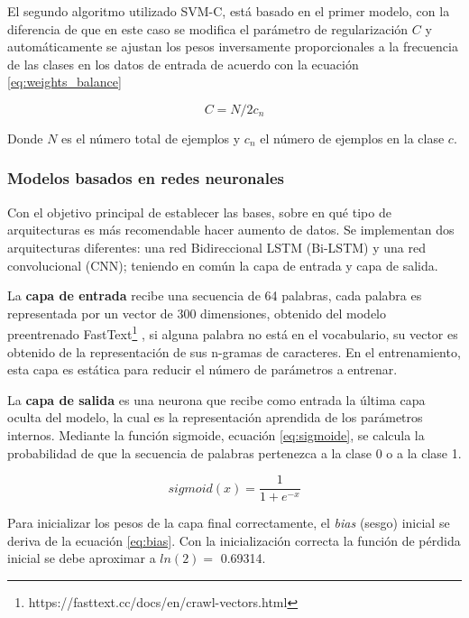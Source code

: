  El segundo algoritmo utilizado SVM-C, está basado en el primer modelo, con la diferencia de que en este caso se modifica el parámetro de regularización $C$ y automáticamente se ajustan los pesos inversamente proporcionales a la frecuencia de las clases en los datos de entrada de acuerdo con la ecuación \ref{eq:weights_balance}
 
 \begin{equation}
 \label{eq:weights_balance}
     C = N/2c_n
 \end{equation}
 
 Donde $N$ es el número total de ejemplos y $c_n$ el número de ejemplos en la clase $c$.  

\subsubsection{Modelos basados en redes neuronales}

Con el objetivo principal de establecer las bases, sobre en qué tipo de arquitecturas es más recomendable hacer aumento de datos. Se implementan dos arquitecturas diferentes: una red Bidireccional LSTM (Bi-LSTM) y una red convolucional (CNN); teniendo en común la capa de entrada y capa de salida.

La \textbf{capa de entrada} recibe una secuencia de 64 palabras, cada palabra es representada por un vector de 300 dimensiones, obtenido del modelo preentrenado FastText\footnote{https://fasttext.cc/docs/en/crawl-vectors.html} , si alguna palabra no está en el vocabulario, su vector es obtenido de la representación de sus n-gramas de caracteres. En el entrenamiento, esta capa es estática para reducir el número de parámetros a entrenar.

La \textbf{capa de salida} es una neurona que recibe como entrada la última capa oculta del modelo, la cual es la representación aprendida de los parámetros internos. Mediante la función sigmoide, ecuación \ref{eq:sigmoide}, se calcula la probabilidad de que la secuencia de palabras pertenezca a la clase 0 o a la clase 1.

\begin{equation}
    \label{eq:sigmoide}
    sigmoid(x) = \frac{1}{1+ e^{-x}}
\end{equation}

Para inicializar los pesos de la capa final correctamente, el \textit{bias} (sesgo) inicial se deriva de la ecuación \ref{eq:bias}. Con la inicialización correcta la función de pérdida inicial se debe aproximar a $ln(2)=$ 0.69314. 


